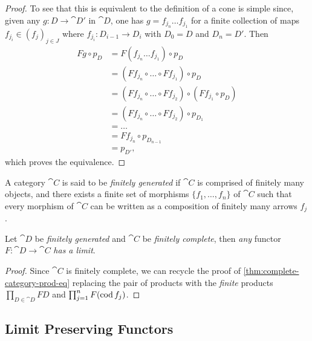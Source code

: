 \begin{proof}
To see that this is equivalent to the definition of a cone is simple since,
given any \(g: D \to \cat D'\) in \(\cat D\), one has
\(g = f_{j_n} \dots f_{j_1}\) for a finite collection of maps
\(f_{j_i} \in (f_j)_{j \in J}\) where \(f_{j_i}: D_{i-1} \to D_i\) with
\(D_0 = D\) and \(D_n = D'\). Then
\begin{align*}
F g \circ p_D
&= F (f_{j_n} \dots f_{j_1}) \circ p_D \\
&= (F f_{j_n} \circ \dots \circ F f_{j_1}) \circ p_D \\
&= (F f_{j_n} \circ \dots \circ F f_{j_2}) \circ (F f_{j_1} \circ p_D) \\
&= (F f_{j_n} \circ \dots \circ F f_{j_2}) \circ p_{D_1} \\
&= \dots \\
&= F f_{j_n} \circ p_{D_{n-1}}\\
&= p_{D'},
\end{align*}
which proves the equivalence.
\end{proof}

\begin{definition}
\label{def:finitely-generated-category}
A category \(\cat C\) is said to be \emph{finitely generated} if \(\cat C\) is
comprised of finitely many objects, and there exists a finite set of
morphisms \(\{f_1, \dots, f_n\}\) of \(\cat C\) such that every morphism of
\(\cat C\) can be written as a composition of finitely many arrows \(f_j\).
\end{definition}

\begin{proposition}
\label{prop:fin-gen-to-fin-complete-has-limits}
Let \(\cat D\) be \emph{finitely generated} and \(\cat C\) be \emph{finitely
  complete}, then \emph{any} functor \(F: \cat D \to \cat C\) \emph{has a
  limit}.
\end{proposition}

\begin{proof}
Since \(\cat C\) is finitely complete, we can recycle the proof of
\cref{thm:complete-category-prod-eq} replacing the pair of products with the
\emph{finite} products \(\prod_{D \in \cat D} F D\) and
\(\prod_{j=1}^n F(\operatorname{cod} f_j)\).
\end{proof}

\subsection{Limit Preserving Functors}

